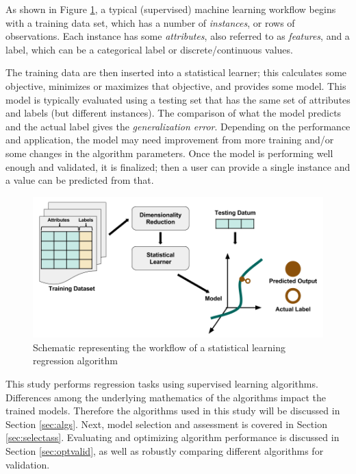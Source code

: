 As shown in Figure \ref{fig:supervised}, a typical (supervised) machine
learning workflow begins with a training data set, which has a number of
\textit{instances}, or rows of observations.  Each instance has some
\textit{attributes}, also referred to as \textit{features}, and a label, which
can be a categorical label or discrete/continuous values.  

The training data are then inserted into a statistical learner; this calculates
some objective, minimizes or maximizes that objective, and provides some model.
This model is typically evaluated using a testing set that has the same set of
attributes and labels (but different instances). The comparison of what the
model predicts and the actual label gives the \textit{generalization error}.
Depending on the performance and application, the model may need improvement
from more training and/or some changes in the algorithm parameters. Once the
model is performing well enough and validated, it is finalized; then a user can
provide a single instance and a value can be predicted from that. 

\begin{figure}[!htb]
  \includegraphics[width=\linewidth]{./chapters/intro/SupervisedRegression.png}
  \caption{Schematic representing the workflow of a statistical learning regression algorithm}
  \label{fig:supervised}
\end{figure}

This study performs regression tasks using supervised learning algorithms.
Differences among the underlying mathematics of the algorithms impact the
trained models.  Therefore the algorithms used in this study will be discussed
in Section \ref{sec:algs}. Next, model selection and assessment is covered in
Section \ref{sec:selectass}.  Evaluating and optimizing algorithm performance
is discussed in Section \ref{sec:optvalid}, as well as robustly comparing
different algorithms for validation.

